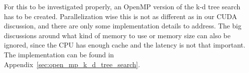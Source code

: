 For this to be investigated properly, an OpenMP version of the k-d tree search has to be created. Parallelization wise this is not as different as in our CUDA discussion, and there are only some implementation details to address. The big discussions around what kind of memory to use or memory size can also be ignored, since the CPU has enough cache and the latency is not that important. The implementation can be found in Appendix~\ref{sec:open_mp_k_d_tree_search}.



















